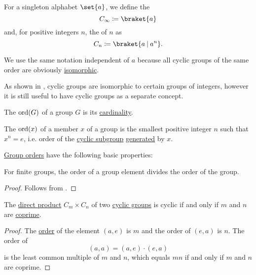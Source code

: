 \begin{definition}\label{def:cyclic_group}
  For a singleton alphabet \( \set{ a } \), we define the 
  \begin{equation*}
    C_\infty \coloneqq \braket{ a }
  \end{equation*}
  and, for positive integers \( n \), the  of  \( n \) as
  \begin{equation*}
    C_n \coloneqq \braket{ a \given a^n }.
  \end{equation*}

  We use the same notation independent of \( a \) because all cyclic groups of the same order are obviously \hyperref[def:group/homomorphism]{isomorphic}.

  As shown in , cyclic groups are isomorphic to certain groups of integers, however it is still useful to have cyclic groups as a separate concept.
\end{definition}

\begin{definition}\label{def:group_order}
  The  \( \operatorname{ord}(G) \) of a group \( G \) is its \hyperref[thm:cardinality_existence]{cardinality}.

  The  \( \operatorname{ord}(x) \) of a member \( x \) of a group is the smallest positive integer \( n \) such that \( x^n = e \), i.e. order of the \hyperref[def:cyclic_group]{cyclic subgroup} \hyperref[def:group/submodel]{generated} by \( x \).
\end{definition}

\begin{proposition}\label{thm:def:group_order/properties}
  \hyperref[def:group_order]{Group orders} have the following basic properties:
  \begin{thmenum}
     For finite groups, the order of a group element divides the order of the group.
  \end{thmenum}
\end{proposition}
\begin{proof}
   Follows from .
\end{proof}

\begin{proposition}\label{thn:product_of_cyclic_groups}
  The \hyperref[def:monoid_direct_product]{direct product} \( C_m \times C_n \) of two \hyperref[def:cyclic_group]{cyclic groups} is cyclic if and only if \( m \) and \( n \) are \hyperref[def:coprime_numbers]{coprime}.
\end{proposition}
\begin{proof}
  The \hyperref[def:group_order]{order} of the element \( (a, e) \) is \( m \) and the order of \( (e, a) \) is \( n \). The order of
  \begin{equation*}
    (a, a) = (a, e) \cdot (e, a)
  \end{equation*}
  is the least common multiple of \( m \) and \( n \), which equals \( mn \) if and only if \( m \) and \( n \) are coprime.
\end{proof}

